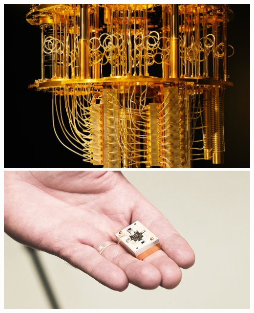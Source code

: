 \documentclass[aspectratio=169,11pt,hyperref={colorlinks=true}]{beamer}
\begin{document}
\begin{frame}
\begin{columns}[t]
            \centering
            \includegraphics[height=.45\textheight]{fridge.jpg}\\
            \includegraphics[height=.45\textheight]{inside-4.jpg}
    \end{columns}
\end{frame}
\end{document}
